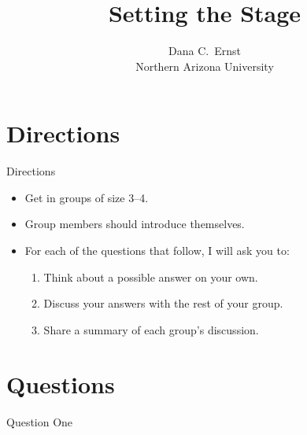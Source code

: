 \documentclass[10pt]{beamer}
\title{Setting the Stage}
\subtitle{}
\author{{\large Dana C.~Ernst}\\
Northern Arizona University}
\date{}
\begin{document}

\maketitle


\section{Directions}


\begin{frame}

\begin{block}{Directions}
\vspace{-.5em}
\begin{itemize}
\item Get in groups of size 3--4.
\item Group members should introduce themselves.
\item For each of the questions that follow, I will ask you to:
\begin{enumerate}
\item \alert{Think} about a possible answer on your own.
\item \alert{Discuss} your answers with the rest of your group.
\item \alert{Share} a summary of each group's discussion.
\end{enumerate}
\end{itemize}
\end{block}

\end{frame}


\section{Questions}


\begin{frame}{Question One}
\ 


\end{frame}
\end{document}
